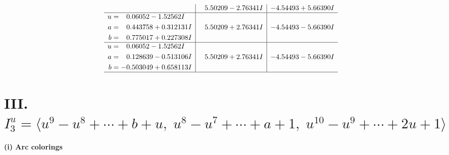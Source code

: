 \documentclass[1p]{elsarticle_modified}
\theoremstyle{definition}
\begin{document}
$$\begin{array}{c|c|c}
 & \phantom{-}5.50209 - 2.76341 I & -4.54493 + 5.66390 I \\ \hline\begin{aligned}
u &= \phantom{-}0.06052 - 1.52562 I \\
a &= \phantom{-}0.443758 + 0.312131 I \\
b &= \phantom{-}0.775017 + 0.227308 I\end{aligned}
 & \phantom{-}5.50209 + 2.76341 I & -4.54493 - 5.66390 I \\ \hline\begin{aligned}
u &= \phantom{-}0.06052 - 1.52562 I \\
a &= \phantom{-}0.128639 - 0.513106 I \\
b &= -0.503049 + 0.658113 I\end{aligned}
 & \phantom{-}5.50209 + 2.76341 I & -4.54493 - 5.66390 I\\
 \hline 
 \end{array}$$\newpage\newpage\renewcommand{\arraystretch}{1}
\centering \section*{III. $I^u_{3}= \langle u^9- u^8+\cdots+b+u,\;u^8- u^7+\cdots+a+1,\;u^{10}- u^9+\cdots+2 u+1 \rangle$}
\flushleft \textbf{(i) Arc colorings}\\
\end{document}
